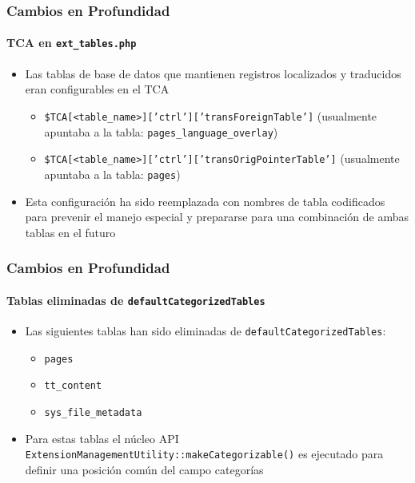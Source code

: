 \begin{frame}[fragile]
	\frametitle{Cambios en Profundidad}
	\framesubtitle{TCA en \texttt{ext\_tables.php}}

	\begin{itemize}
		\item Las tablas de base de datos que mantienen registros localizados y traducidos eran configurables en el TCA

			\begin{itemize}
				\item \texttt{\$TCA[<table\_name>]['ctrl']['transForeignTable']}\newline
					(usualmente apuntaba a la tabla: \texttt{pages\_language\_overlay})
				\item \texttt{\$TCA[<table\_name>]['ctrl']['transOrigPointerTable']}\newline
					(usualmente apuntaba a la tabla: \texttt{pages})
			\end{itemize}

		\item Esta configuración ha sido reemplazada con nombres de tabla codificados para prevenir
			el manejo especial y prepararse para una combinación de ambas tablas en el futuro

	\end{itemize}

\end{frame}

\begin{frame}[fragile]
	\frametitle{Cambios en Profundidad}
	\framesubtitle{Tablas eliminadas de \texttt{defaultCategorizedTables}}

	\begin{itemize}
		\item Las siguientes tablas han sido eliminadas de \texttt{defaultCategorizedTables}:

			\begin{itemize}
				\item \texttt{pages}
				\item \texttt{tt\_content}
				\item \texttt{sys\_file\_metadata}
			\end{itemize}

		\item Para estas tablas el núcleo API\newline
			\texttt{ExtensionManagementUtility::makeCategorizable()}\newline
			es ejecutado para definir una posición común del campo categorías

	\end{itemize}

\end{frame}


